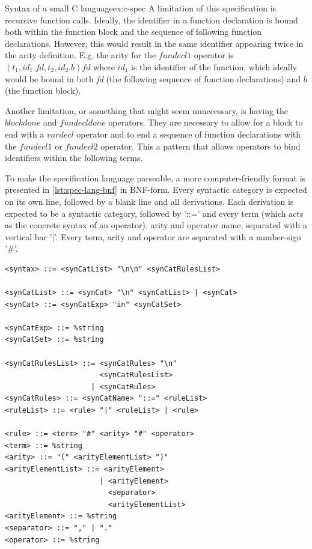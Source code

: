 \begin{example}[breakable]{Syntax of a small C language}{ex:c-spec}
  A limitation of this specification is recursive function calls. Ideally, the identifier in a function declaration is bound both within the function block and the sequence of following function declarations. However, this would result in the same identifier appearing twice in the arity definition. E.g. the arity for the $\textit{fundecl1}$ operator is $(t_1,id_1.\textit{fd},t_2,id_2.b)fd$ where $id_1$ is the identifier of the function, which ideally would be bound in both \textit{fd} (the following sequence of function declarations) and $b$ (the function block).

  Another limitation, or something that might seem unnecessary, is having the $blockdone$ and $fundecldone$ operators. They are necessary to allow for a block to end with a $vardecl$ operator and to end a sequence of function declarations with the $fundecl1$ or $fundecl2$ operator. This a pattern that allows operators to bind identifiers within the following terms.

\end{example}
\newpage

\begin{minipage}{\textwidth}
  To make the specification language parseable, a more computer-friendly format is
  presented in \cref{lst:spec-lang-bnf} in BNF-form. Every syntactic category is
  expected on its own line, followed by a blank line and all derivations.
  Each derivation is expected to be a syntactic category, followed by '::=' and
  every term (which acts as the concrete syntax of an operator), arity and operator
  name, separated with a vertical bar '$|$'. Every term, arity and operator are separated
  with a number-sign '\#'.
\end{minipage}

\begin{minipage}{\linewidth}
  \begin{lstlisting}[style=inline,caption=The specification language itself in BNF-form,label=lst:spec-lang-bnf]
<syntax> ::= <synCatList> "\n\n" <synCatRulesList>

<synCatList> ::= <synCat> "\n" <synCatList> | <synCat>
<synCat> ::= <synCatExp> "in" <synCatSet>

<synCatExp> ::= %string
<synCatSet> ::= %string

<synCatRulesList> ::= <synCatRules> "\n" 
                      <synCatRulesList> 
                    | <synCatRules>
<synCatRules> ::= <synCatName> "::=" <ruleList>
<ruleList> ::= <rule> "|" <ruleList> | <rule>

<rule> ::= <term> "#" <arity> "#" <operator>
<term> ::= %string
<arity> ::= "(" <arityElementList> ")"
<arityElementList> ::= <arityElement> 
                      | <arityElement> 
                        <separator> 
                        <arityElementList>
<arityElement> ::= %string
<separator> ::= "," | "."
<operator> ::= %string
\end{lstlisting}
\end{minipage}

